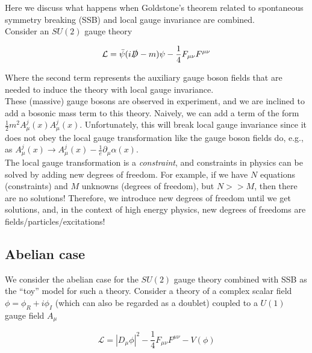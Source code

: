 \noindent Here we discuss what happens when Goldstone's theorem related to spontaneous symmetry breaking (SSB) and local gauge invariance are combined. \\

\noindent Consider an $SU(2)$ gauge theory

\begin{equation}
\mathcal{L} = \bar{\psi} ( i \slashed{D} - m) \psi - \frac{1}{4} F_{\mu\nu} F^{\mu\nu}
\end{equation}

\noindent Where the second term represents the auxiliary gauge boson fields that are needed to induce the theory with local gauge invariance. \\

\noindent These (massive) gauge bosons are observed in experiment, and we are inclined to add a bosonic mass term to this theory. Naively, we can add a term of the form $\frac{1}{2} m^2 A_\mu^j (x) A_\mu^j (x)$. Unfortunately, this will break local gauge invariance since it does not obey the local gauge transformation like the gauge boson fields do, e.g., as $A_\mu^j (x) \rightarrow A_\mu^j (x) - \frac{1}{e} \partial_\mu \alpha (x)$. \\

\noindent The local gauge transformation is a \textit{constraint}, and constraints in physics can be solved by adding new degrees of freedom. For example, if we have $N$ equations (constraints) and $M$ unknowns (degrees of freedom), but $N >> M$, then there are no solutions! Therefore, we introduce new degrees of freedom until we get solutions, and, in the context of high energy physics, new degrees of freedoms are fields/particles/excitations! \\

\subsection*{Abelian case}

\noindent We consider the abelian case for the $SU(2)$ gauge theory combined with SSB as the ``toy'' model for such a theory. Consider a theory of a complex scalar field $\phi = \phi_R + i \phi_I$ (which can also be regarded as a doublet) coupled to a $U(1)$ gauge field $A_\mu$

\begin{equation}
\mathcal{L} = |D_\mu \phi |^2 - \frac{1}{4} F_{\mu\nu} F^{\mu\nu} - V(\phi)
\end{equation}

